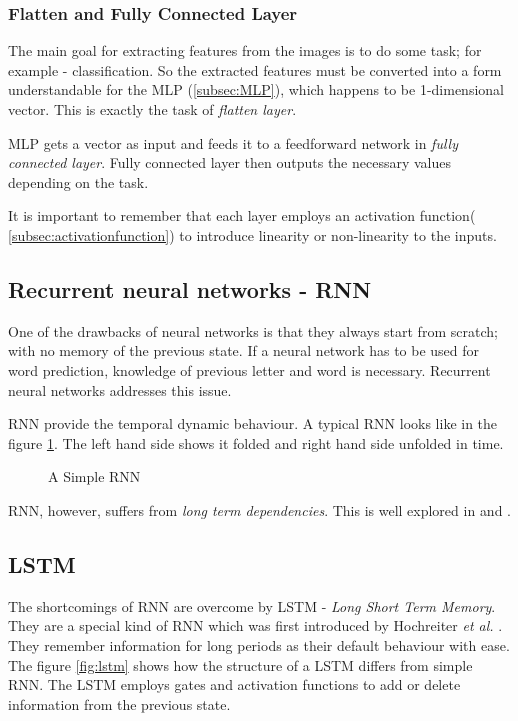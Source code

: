 \subsubsection*{Flatten and Fully Connected Layer}
The main goal for extracting features from the images is to do some task; for example -
classification. So the extracted features must be converted into a form understandable for
the MLP (\ref{subsec:MLP}), which happens to be 1-dimensional vector. This is exactly the
task of \textit{flatten layer}.

MLP gets a vector as input and feeds it to a feedforward network in \textit{fully
connected layer}. Fully connected layer then outputs the necessary values depending on the
task.

It is important to remember that each layer employs an activation function(
\ref{subsec:activationfunction}) to introduce linearity or non-linearity to the inputs.

\subsection{Recurrent neural networks - RNN}
One of the drawbacks of neural networks is that they always start from scratch; with no
memory of the previous state. If a neural network has to be used for word prediction,
knowledge of previous letter and word is necessary. Recurrent neural networks addresses
this issue.

RNN provide the temporal dynamic behaviour. A typical RNN looks like in the figure
\ref{fig:RNN}. The left hand side shows it folded and right hand side unfolded in time.
\begin{figure}[h]
	\centering
        \def\svgwidth{1.0\textwidth}
        
    \caption{A Simple RNN}
    \label{fig:RNN}
\end{figure}
RNN, however, suffers from \textit{long term dependencies}. This is well explored in
\cite{RNNdrawback1} and \cite{RNNdrawback2}.

\subsection{LSTM}
\label{subsubsec:lstm}
The shortcomings of RNN are overcome by LSTM - \textit{Long Short Term Memory}.
They are a special kind of RNN which was first introduced by Hochreiter \textit{et al.} \cite{LSTMPaper}. They remember
information for long periods as their default behaviour with ease. The figure
\ref{fig:lstm} shows how the structure of a LSTM differs from simple RNN. The LSTM employs
gates and activation functions to add or delete information from the previous state.

